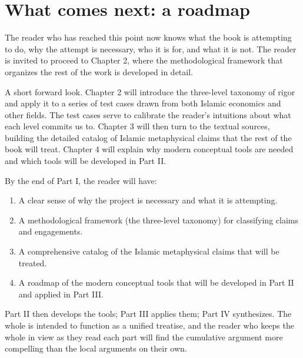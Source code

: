 \section{What comes next: a roadmap}

The reader who has reached this point now knows what the book is
attempting to do, why the attempt is necessary, who it is for, and
what it is not. The reader is invited to proceed to Chapter 2, where
the methodological framework that organizes the rest of the work is
developed in detail.

A short forward look. Chapter 2 will introduce the three-level
taxonomy of rigor and apply it to a series of test cases drawn from
both Islamic economics and other fields. The test cases serve to
calibrate the reader's intuitions about what each level commits us
to. Chapter 3 will then turn to the textual sources, building the
detailed catalog of Islamic metaphysical claims that the rest of the
book will treat. Chapter 4 will explain why modern conceptual tools
are needed and which tools will be developed in Part II.

By the end of Part I, the reader will have:
\begin{enumerate}[leftmargin=2em]
    \item A clear sense of why the project is necessary and what it
    is attempting.
    \item A methodological framework (the three-level taxonomy) for
    classifying claims and engagements.
    \item A comprehensive catalog of the Islamic metaphysical claims
    that will be treated.
    \item A roadmap of the modern conceptual tools that will be
    developed in Part II and applied in Part III.
\end{enumerate}

Part II then develops the tools; Part III applies them; Part IV
synthesizes. The whole is intended to function as a unified
treatise, and the reader who keeps the whole in view as they read
each part will find the cumulative argument more compelling than
the local arguments on their own.

